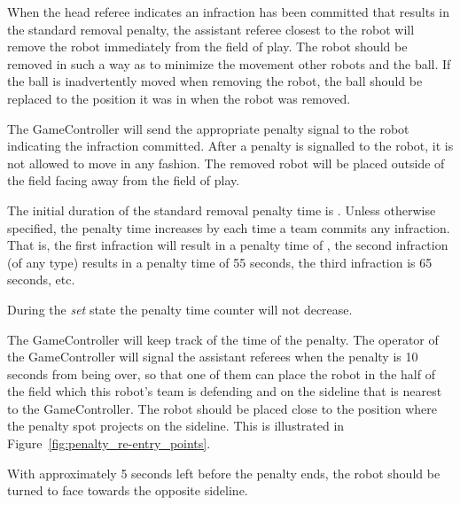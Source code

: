 When the head referee indicates an infraction has been committed that results in the standard removal penalty, the assistant referee closest to the robot will remove the robot immediately from the field of play. The robot should be removed in such a way as to minimize the movement other robots and the ball. If the ball is inadvertently moved when removing the robot, the ball should be replaced to the position it was in when the robot was removed.

The GameController will send the appropriate penalty signal to the robot indicating the infraction committed. After a penalty is signalled to the robot, it is not allowed to move in any fashion. The removed robot will be placed outside of the field facing away from the field of play.

The initial duration of the standard removal penalty time is \StandardPenaltyTime.
Unless otherwise specified, the penalty time increases by \StandardPenaltyIncrease each time a team commits any infraction.
That is, the first infraction will result in a penalty time of \StandardPenaltyTime, the second infraction (of any type) results in a penalty time of 55 seconds, the third infraction is 65 seconds, etc.

During the \emph{set} state the penalty time counter will not decrease.

The GameController will keep track of the time of the penalty. The operator of the GameController will signal the assistant referees when the penalty is 10 seconds from being over, so that one of them can place the robot in the half of the field which this robot's team is defending and on the sideline that is nearest to the GameController. The robot should be placed close to the position where the penalty spot projects on the sideline. This is illustrated in Figure~\ref{fig:penalty_re-entry_points}.

With approximately 5 seconds left before the penalty ends, the robot should be turned to face towards the opposite sideline.

